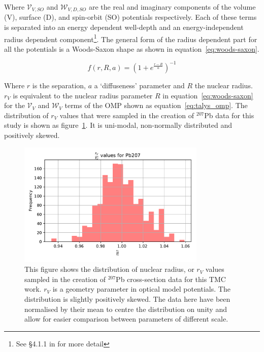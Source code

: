 Where $\mathcal{V}_{V,SO}$ and $\mathcal{W}_{V,D,SO}$ are the real and imaginary components of the volume (V), surface (D), and spin-orbit (SO) potentials respectively. Each of these terms is separated into an energy dependent well-depth and an energy-independent radius dependent component\footnote{See §4.1.1 in \cite{TALYS2017} for more detail}. The general form of the radius dependent part for all the potentials is a Woods-Saxon shape \cite{Woods1954} as shown in equation~\ref{eq:woods-saxon}.

\begin{equation}
  \label{eq:woods-saxon}
  f(r,R,a) = \left(1 + e^{\frac{r-R}{a}}\right)^{-1}
\end{equation}

Where $r$ is the separation, $a$ a `diffuseness' parameter and $R$ the nuclear radius. $r_{V}$ is equivalent to the nuclear radius parameter $R$ in equation~\ref{eq:woods-saxon} for the $\mathcal{V}_{V}$ and $\mathcal{W}_{V}$ terms of the OMP shown as equation~\ref{eq:talys_omp}. The distribution of $r_{V}$ values that were sampled in the creation of $^{207}$Pb data for this study is shown as figure~\ref{fig:pb207_rvadjust_hist}. It is uni-modal, non-normally distributed and positively skewed. 

\begin{figure}[H]
  \centering
	\includegraphics[width=0.8\textwidth]{rvadjust_param_Pb207_histogram}
	\caption{This figure shows the distribution of nuclear radius, or $r_{V}$ values sampled in the creation of $^{207}$Pb cross-section data for this TMC work. $r_{V}$ is a geometry parameter in optical model potentials. The distribution is slightly positively skewed. The data here have been normalised by their mean to centre the distribution on unity and allow for easier comparison between parameters of different scale.}
	\label{fig:pb207_rvadjust_hist}
\end{figure}

